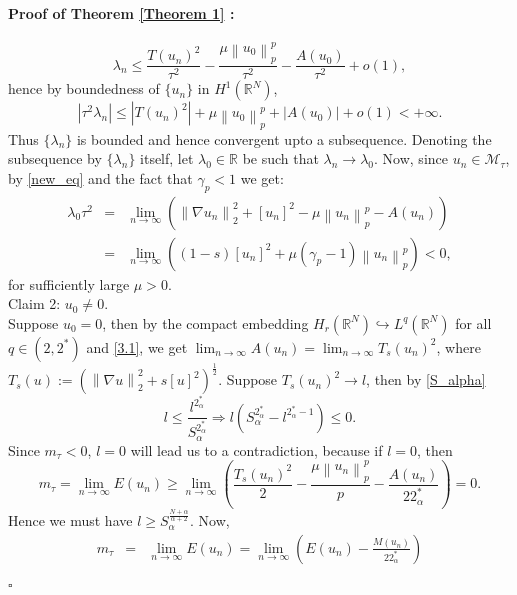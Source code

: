 \documentclass[11pt]{article}
\numberwithin{equation}{section}
\numberwithin{mytheorem}{section}
\newenvironment{myproof}[2] {\paragraph{Proof of {#1} {#2} :}}{\hfill$\square$}
\begin{document}
\begin{myproof}{Theorem}{\ref{Theorem 1}}
			$$\lambda_n \leq\frac{T(u_n)^2}{\tau^2}-\frac{\mu \left\| u_0\right\|_p^p}{\tau^2}-\frac{A(u_0)}{\tau^2}+o(1),$$
			hence by boundedness of $\{u_n\}$ in $H^1(\mathbb{R}^N)$, 
			$$|\tau^2\lambda_n|\leq |T(u_n)^2|+\mu \left\| u_0 \right\|_p^p+|A(u_0)|+o(1)<+\infty.$$
			Thus $\{\lambda_n\}$ is bounded and hence convergent upto a subsequence. Denoting the subsequence by $\{\lambda_n\}$ itself, let $\lambda_0\in \mathbb{R}$ be such that $\lambda_n\rightarrow \lambda_0$. Now, since $u_n\in \mathcal{M}_{\tau}$, by \eqref{new_eq} and the fact that $\gamma_p<1$ we get:
			\begin{eqnarray*}
				\lambda_0\tau^2 & = & \lim_{n\rightarrow \infty}\left( \left\| \nabla u_n \right\|_2^2+[u_n]^2-\mu\left\| u_n\right\|_p^p-A(u_n)\right)\\
				& = & \lim_{n\rightarrow \infty} \left((1-s)[u_n]^2+\mu\left(\gamma_p-1\right)\left\| u_n \right\|_p^p\right)< 0,
			\end{eqnarray*}
			for sufficiently large $\mu>0$.\\
			Claim 2: $u_0\neq 0$.\\
			Suppose $u_0=0$, then by the compact embedding $H_r(\mathbb{R}^N)\hookrightarrow L^q(\mathbb{R}^N)$ for all $q\in (2,2^*)$ and \eqref{3.1}, we get $\displaystyle \lim_{n\rightarrow \infty}A(u_n)=\lim_{n\rightarrow \infty}T_s(u_n)^2$, where $T_s(u):=(\left\| \nabla u \right\|_2^2+s[u]^2)^{\frac{1}{2}}$. Suppose $T_s(u_n)^2\rightarrow l$, then by \eqref{S_alpha}
			$$l\leq \frac{l^{2^*_{\alpha}}}{S_{\alpha}^{2^*_{\alpha}}}\Rightarrow l(S_{\alpha}^{2^*_{\alpha}}-l^{2^*_{\alpha}-1})\leq 0.$$
			Since $m_{\tau}<0$, $l=0$ will lead us to a contradiction, because if $l=0$, then
			\begin{equation*}
				m_{\tau}=\lim_{n\rightarrow \infty} E(u_n)\geq \lim_{n\rightarrow \infty}\left(\frac{T_s(u_n)^2}{2}-\frac{\mu \left\| u_n \right\|_p^p}{p}-\frac{A(u_n)}{22^*_{\alpha}}\right)=0.
			\end{equation*}
			Hence we must have $l\geq S_{\alpha}^{\frac{N+\alpha}{\alpha+2}}$. Now,
			\begin{eqnarray*}
				m_{\tau} & = & \lim_{n\rightarrow \infty}E(u_n) =\lim_{n\rightarrow \infty}\left(E(u_n)-\frac{M(u_n)}{22^*_{\alpha}}\right)\\

\end{eqnarray*}
\end{myproof}
\end{document}
